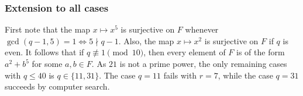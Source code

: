 \subsubsection*{Extension to all cases}

First note that the map $x \mapsto x^5$ is surjective on $F$ whenever $\gcd(q - 1, 5) = 1 \iff 5 \nmid q - 1$.
Also, the map $x \mapsto x^2$ is surjective on $F$ if $q$ is even.
It follows that if $q \not\equiv 1 \pmod{10}$, then every element of $F$ is of the form $a^2 + b^5$ for some $a, b \in F$.
As $21$ is not a prime power, the only remaining cases with $q \leq 40$ is $q \in \{11, 31\}$.
The case $q = 11$ fails with $r = 7$, while the case $q = 31$ succeeds by computer search.
